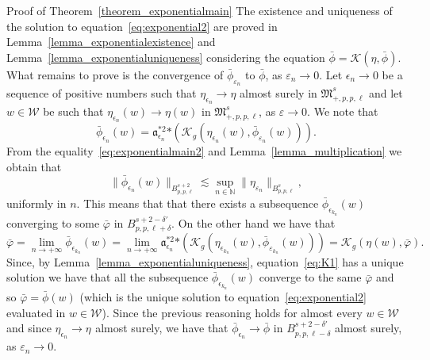 \documentclass[a4paper,10pt]{article}
\newcommand{\asterisk}{\mathord{*}}
\newenvironment{proof*}[1]{\noindent\textbf{#1\ }}{\hspace*{\fill}$\Box$\medskip}
\begin{document}
\begin{proof*}{Proof of Theorem~\ref{theorem_exponentialmain}}
  The existence and uniqueness of the solution to
  equation~{\eqref{eq:exponential2}} are proved in
  Lemma~\ref{lemma_exponentialexistence} and
  Lemma~\ref{lemma_exponentialuniqueness} considering the equation $\bar{\phi}
  = \mathcal{K} (\eta, \bar{\phi})$. What remains to prove is the convergence
  of $\bar{\phi}_{\varepsilon_n}$ to $\bar{\phi}$, as $\varepsilon_n
  \rightarrow 0$. Let $\epsilon_n \rightarrow 0$ be a sequence of positive
  numbers such that $\eta_{\epsilon_n} \rightarrow \eta$ almost surely in
  $\mathfrak{M}^s_{+, p, p, \ell}$ and let $w \in \mathcal{W}$ be such that
  $\eta_{\epsilon_n} (w) \rightarrow \eta (w)$ in $\mathfrak{M}^s_{+, p, p,
  \ell}$, as $\varepsilon \rightarrow 0$. We note that
  \begin{equation}
    \bar{\phi}_{\epsilon_n} (w) = \mathfrak{a}^{\asterisk 2}_{\epsilon_n}
    \asterisk (\mathcal{K}_g (\eta_{\epsilon_n} (w),
    \bar{\phi}_{\varepsilon_n} (w))) . \label{eq:exponentialmain2}
  \end{equation}
  From the equality~{\eqref{eq:exponentialmain2}} and
  Lemma~\ref{lemma_multiplication} we obtain that
  \[ \| \bar{\phi}_{\epsilon_n} (w) \|_{B^{s + 2}_{p, p, \ell}} \lesssim
     \sup_{n \in \mathbb{N}} \| \eta_{\varepsilon_n} \|_{B^s_{p, p, \ell}}, \]
  uniformly in $n$. This means that that there exists a subsequence
  $\bar{\phi}_{\epsilon_{k_n}} (w)$ converging to some $\bar{\varphi}$ in
  $B^{s + 2 - \delta'}_{p, p, \ell + \delta}$. On the other hand we have that
  \[ \bar{\varphi} = \lim_{n \rightarrow + \infty}
     \bar{\phi}_{\epsilon_{k_n}} (w) = \lim_{n \rightarrow + \infty}
     \mathfrak{a}^{\asterisk 2}_{\epsilon_n} \asterisk \left( \mathcal{K}_g
     \left( \eta_{\epsilon_{k_n}} (w), \bar{\phi}_{\varepsilon_{k_n}} (w)
     \right) \right) = \mathcal{K}_g (\eta (w), \bar{\varphi}) . \]
  Since, by Lemma~\ref{lemma_exponentialuniqueness}, equation~{\eqref{eq:K1}}
  has a unique solution we have that all the subsequence
  $\bar{\phi}_{\epsilon_{k_n}} (w)$ converge to the same $\bar{\varphi}$ and
  so $\bar{\varphi} = \bar{\phi} (w)$ (which is the unique solution to
  equation~{\eqref{eq:exponential2}} evaluated in $w \in \mathcal{W}$). Since
  the previous reasoning holds for almost every $w \in \mathcal{W}$ and since
  $\eta_{\epsilon_n} \rightarrow \eta_{}$ almost surely, we have that
  $\bar{\phi}_{\epsilon_n} \rightarrow \bar{\phi}$ in $B^{s + 2 - \delta'}_{p,
  p, \ell - \delta}$ almost surely, as $\varepsilon_n \rightarrow 0$.
\end{proof*}
\end{document}
